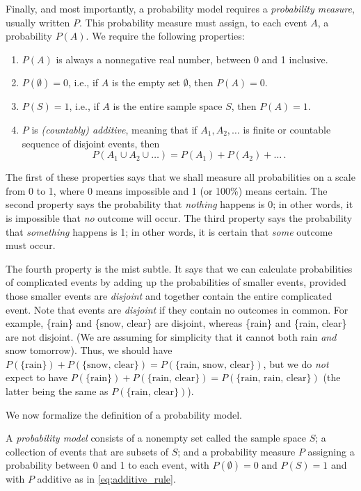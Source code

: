 Finally, and most importantly, a probability model requires a \emph{probability measure}, usually written $P$. This probability measure must assign, to each event $A$, a probability $P(A)$. We require the following properties:
\begin{enumerate}
    \item $P(A)$ is always a nonnegative real number, between 0 and 1 inclusive.
    \item $P(\emptyset) = 0$, i.e., if $A$ is the empty set $\emptyset$, then $P(A)=0$.
    \item $P(S)=1$, i.e., if $A$ is the entire sample space $S$, then $P(A)=1$.
    \item $P$ is \emph{(countably) additive}, meaning that if $A_1, A_2, \dots$ is finite or countable sequence of disjoint events, then
    \begin{equation}\label{eq:additive_rule}
        P(A_1 \cup A_2 \cup \ldots) = P(A_1) + P(A_2) + \ldots\,.
    \end{equation}
\end{enumerate}

The first of these properties says that we shall measure all probabilities on a scale from 0 to 1, where 0 means impossible and 1 (or 100\%) means certain. The second property says the probability that \emph{nothing} happens is 0; in other words, it is impossible that \emph{no} outcome will occur. The third property says the probability that \emph{something} happens is 1; in other words, it is certain that \emph{some} outcome must occur.

The fourth property is the mist subtle. It says that we can calculate probabilities of complicated events by adding up  the probabilities of smaller events, provided those smaller events are \emph{disjoint} and together contain the entire complicated event. Note that events  are \emph{disjoint} if they contain no outcomes in common. For example, \{rain\} and \{snow, clear\} are disjoint, whereas \{rain\} and \{rain, clear\} are not disjoint. (We are assuming for simplicity that it cannot both rain \emph{and} snow tomorrow). Thus, we should have $P(\{\text{rain}\}) + P(\{\text{snow, clear}\}) = P(\{\text{rain, snow, clear}\})$, but we do \emph{not} expect to have $P(\{\text{rain}\}) + P(\{\text{rain, clear}\}) = P(\{\text{rain, rain, clear}\})$ (the latter being the same as $P(\{\text{rain, clear}\})$).

We now formalize the definition of a probability model.
\begin{definition}
A \emph{probability model}    consists of a nonempty set called the sample space $S$; a collection of events that are subsets of $S$; and a probability measure $P$ assigning a probability between 0 and 1 to each event, with $P(\emptyset)=0$ and $P(S)=1$ and with $P$ additive as in \eqref{eq:additive_rule}.
\end{definition}

